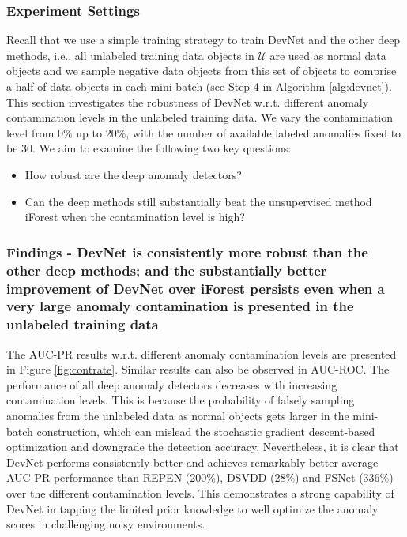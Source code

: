 \documentclass[sigconf]{acmart}
\begin{document}
\subsubsection{Experiment Settings}
Recall that we use a simple training strategy to train DevNet and the other deep methods, i.e., all unlabeled training data objects in $\mathcal{U}$ are used as normal data objects and we sample negative data objects from this set of objects to comprise a half of data objects in each mini-batch (see Step 4 in Algorithm \ref{alg:devnet}). This section investigates the robustness of DevNet w.r.t. different anomaly contamination levels in the unlabeled training data. We vary the contamination level from 0\% up to 20\%, with the number of available labeled anomalies fixed to be 30. We aim to examine the following two key questions: 
\begin{itemize}
    \item How robust are the deep anomaly detectors?
    \item Can the deep methods still substantially beat the unsupervised method iForest when the contamination level is high? 
\end{itemize}


\subsubsection{Findings - DevNet is consistently more robust than the other deep methods; and the substantially better improvement of DevNet over iForest persists even when a very large anomaly contamination is presented in the unlabeled training data}

The AUC-PR results w.r.t. different anomaly contamination levels are presented in Figure \ref{fig:contrate}. Similar results can also be observed in AUC-ROC. The performance of all deep anomaly detectors decreases with increasing contamination levels. This is because the probability of falsely sampling anomalies from the unlabeled data as normal objects gets larger in the mini-batch construction, which can mislead the stochastic gradient descent-based optimization and downgrade the detection accuracy. Nevertheless, it is clear that DevNet performs consistently better and achieves remarkably better average AUC-PR performance than REPEN (200\%), DSVDD (28\%) and FSNet (336\%) over the different contamination levels. This demonstrates a strong capability of DevNet in tapping the limited prior knowledge to well optimize the anomaly scores in challenging noisy environments.
\end{document}
